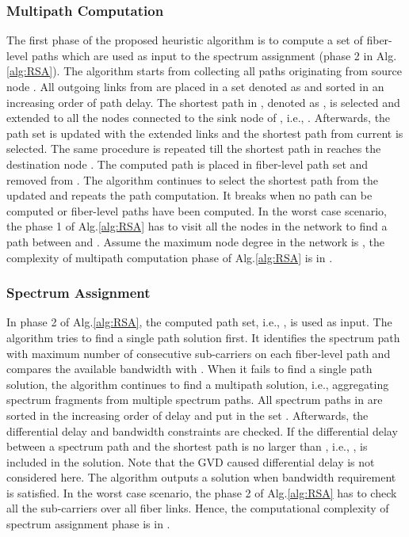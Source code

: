 \documentclass[conference]{IEEEtran}
\begin{document}
\subsubsection{Multipath Computation}
The first phase of the proposed heuristic algorithm is to compute a set of fiber-level paths which are used as input to the spectrum 
assignment (phase 2 in Alg.\ref{alg:RSA}).  The algorithm starts from collecting all paths originating from source node .  
All outgoing links from  are placed in a set denoted as  and sorted in an increasing order of path delay. The shortest 
path in , denoted as , is selected and extended to all the nodes connected to the sink node of , i.e., . 
Afterwards, the path set 
is updated with the extended links and  the shortest path from current  is selected. The same procedure is repeated 
till the shortest path in  reaches the destination node . The computed path  is placed in fiber-level path set 
 and removed from .
The algorithm continues to select the shortest path from the updated  and repeats the path computation. It breaks when no path can be computed or  fiber-level paths have been computed.  
In the worst case scenario, the phase 1 of Alg.\ref{alg:RSA} has to visit all the nodes in the network to find a path  between  and . Assume the maximum node degree in the network  is , the complexity of multipath computation phase of  Alg.\ref{alg:RSA} is in .
 
\subsubsection{Spectrum Assignment}
In phase 2 of Alg.\ref{alg:RSA}, the computed path set, i.e., , is used as input. The algorithm tries to find a single path solution first.  It identifies the spectrum path with maximum number of consecutive sub-carriers on each fiber-level path  and compares the available bandwidth with .  
When it fails to find a single path  solution, the algorithm continues to find a multipath solution, i.e., aggregating 
spectrum fragments from multiple spectrum paths. All spectrum paths in  are sorted in the increasing 
order of delay and put in the set . Afterwards, the differential delay and bandwidth constraints are  checked. If  the 
differential delay between a spectrum path  and the shortest path  is no 
larger than , i.e., ,   is included in the solution. Note that the GVD caused differential delay is not considered here. The algorithm outputs a solution 
when bandwidth requirement is satisfied.   In the worst case scenario, the phase 2 of Alg.\ref{alg:RSA} has to check 
all the sub-carriers over all fiber links. Hence, the computational complexity of spectrum assignment phase is in .  
 
\end{document}
